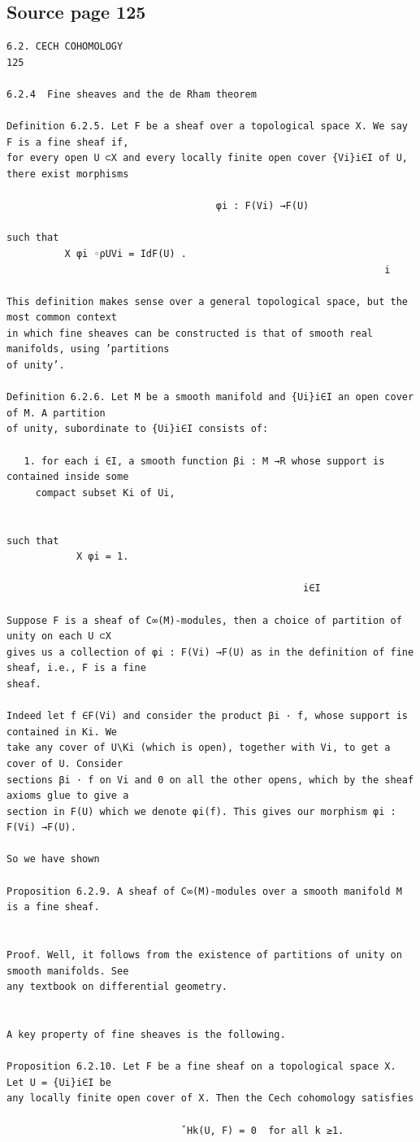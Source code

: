 \subsection*{Source page 125}
\begin{Verbatim}[fontsize=\small]
6.2. CECH COHOMOLOGY                                                   125

6.2.4  Fine sheaves and the de Rham theorem

Definition 6.2.5. Let F be a sheaf over a topological space X. We say F is a fine sheaf if,
for every open U ⊂X and every locally finite open cover {Vi}i∈I of U, there exist morphisms

                                    φi : F(Vi) →F(U)

such that
          X φi ◦ρUVi = IdF(U) .
                                                                 i

This definition makes sense over a general topological space, but the most common context
in which fine sheaves can be constructed is that of smooth real manifolds, using ’partitions
of unity’.

Definition 6.2.6. Let M be a smooth manifold and {Ui}i∈I an open cover of M. A partition
of unity, subordinate to {Ui}i∈I consists of:

   1. for each i ∈I, a smooth function βi : M →R whose support is contained inside some
     compact subset Ki of Ui,


such that
            X φi = 1.

                                                   i∈I

Suppose F is a sheaf of C∞(M)-modules, then a choice of partition of unity on each U ⊂X
gives us a collection of φi : F(Vi) →F(U) as in the definition of fine sheaf, i.e., F is a fine
sheaf.

Indeed let f ∈F(Vi) and consider the product βi · f, whose support is contained in Ki. We
take any cover of U\Ki (which is open), together with Vi, to get a cover of U. Consider
sections βi · f on Vi and 0 on all the other opens, which by the sheaf axioms glue to give a
section in F(U) which we denote φi(f). This gives our morphism φi : F(Vi) →F(U).

So we have shown

Proposition 6.2.9. A sheaf of C∞(M)-modules over a smooth manifold M is a fine sheaf.


Proof. Well, it follows from the existence of partitions of unity on smooth manifolds. See
any textbook on differential geometry.


A key property of fine sheaves is the following.

Proposition 6.2.10. Let F be a fine sheaf on a topological space X. Let U = {Ui}i∈I be
any locally finite open cover of X. Then the Cech cohomology satisfies

                              ˇHk(U, F) = 0  for all k ≥1.
\end{Verbatim}

